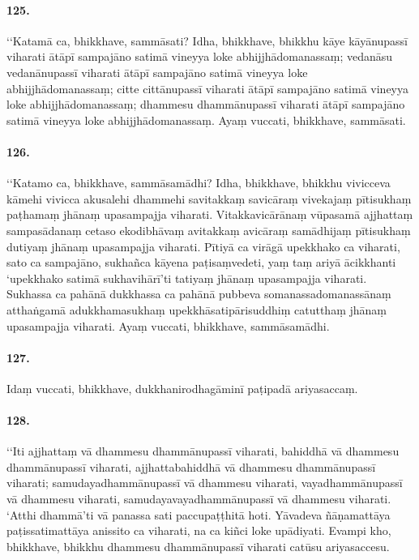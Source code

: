 \paragraph{125.} ‘‘Katamā ca, bhikkhave, sammāsati? Idha, bhikkhave, bhikkhu kāye kāyānupassī viharati ātāpī sampajāno satimā vineyya loke abhijjhādomanassaṃ; vedanāsu vedanānupassī viharati ātāpī sampajāno satimā vineyya loke abhijjhādomanassaṃ; citte cittānupassī viharati ātāpī sampajāno satimā vineyya loke abhijjhādomanassaṃ; dhammesu dhammānupassī viharati ātāpī sampajāno satimā vineyya loke abhijjhādomanassaṃ. Ayaṃ vuccati, bhikkhave, sammāsati.

\paragraph{126.} ‘‘Katamo ca, bhikkhave, sammāsamādhi? Idha, bhikkhave, bhikkhu vivicceva kāmehi vivicca akusalehi dhammehi savitakkaṃ savicāraṃ vivekajaṃ pītisukhaṃ paṭhamaṃ jhānaṃ upasampajja viharati. Vitakkavicārānaṃ vūpasamā ajjhattaṃ sampasādanaṃ cetaso ekodibhāvaṃ avitakkaṃ avicāraṃ samādhijaṃ pītisukhaṃ dutiyaṃ jhānaṃ upasampajja viharati. Pītiyā ca virāgā upekkhako ca viharati, sato ca sampajāno, sukhañca kāyena paṭisaṃvedeti, yaṃ taṃ ariyā ācikkhanti ‘upekkhako satimā sukhavihārī’ti tatiyaṃ jhānaṃ upasampajja viharati. Sukhassa ca pahānā dukkhassa ca pahānā pubbeva somanassadomanassānaṃ atthaṅgamā adukkhamasukhaṃ upekkhāsatipārisuddhiṃ catutthaṃ jhānaṃ upasampajja viharati. Ayaṃ vuccati, bhikkhave, sammāsamādhi.

\paragraph{127.} Idaṃ vuccati, bhikkhave, dukkhanirodhagāminī paṭipadā ariyasaccaṃ.

\paragraph{128.} ‘‘Iti ajjhattaṃ vā dhammesu dhammānupassī viharati, bahiddhā vā dhammesu dhammānupassī viharati, ajjhattabahiddhā vā dhammesu dhammānupassī viharati; samudayadhammānupassī vā dhammesu viharati, vayadhammānupassī vā dhammesu viharati, samudayavayadhammānupassī vā dhammesu viharati. ‘Atthi dhammā’ti vā panassa sati paccupaṭṭhitā hoti. Yāvadeva ñāṇamattāya paṭissatimattāya anissito ca viharati, na ca kiñci loke upādiyati. Evampi kho, bhikkhave, bhikkhu dhammesu dhammānupassī viharati catūsu ariyasaccesu.


